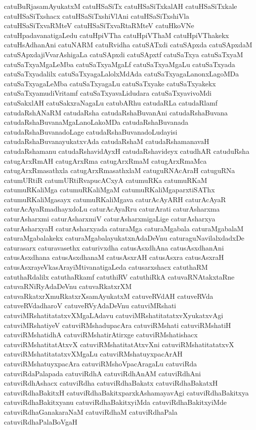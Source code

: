 {catuBuRjasamAyukatxM
catuHSaSiTx
catuHSaSiTxkalAH
catuHSaSiTxkale
catuHSaSiTxshacx
catuHSaSiTxshiVlAni
catuHSaSiTxshiVla
catuHSaSiTxvaRMteV
catuHSaSiTxvaRtaRMteV
catuHkoVNe
catuHpadavanatigaLedu
catuHpiVTha
catuHpiVThaM
catuHpiVThakekx
catuHsAdhanAni
catuNARM
catuRvidha
catuSATxdi
catuSApxda
catuSApxdaM
catuSApxdajiVvarAshigaLa
catuSApxdi
catuSApxtf
catuSaTxya
catuSaTxyaM
catuSaTxyaMgaLeMba
catuSaTxyaMgaLf
catuSaTxyaMgaLu
catuSaTxyada
catuSaTxyadalilx
catuSaTxyagaLalolxMdAda
catuSaTxyagaLanonxLagoMDa
catuSaTxyagaLeMba
catuSaTxyagaLu
catuSaTxyake
catuSaTxyakekx
catuSaTxyamudiVritamf
catuSaTxyavaLidudara
catuSaTxyavivoMdi
catuSakxlAH
catuSakxraNagaLu
catubARhu
catudaRLa
catudaRlamf
catudaRshANaRM
catudaRsha
catudaRshaBuvanAni
catudaRshaBuvana
catudaRshaBuvanaMgaLanoLakoMDa
catudaRshaBuvanada
catudaRshaBuvanadoLage
catudaRshaBuvanadoLudayisi
catudaRshaBuvanayukatxvAda
catudaRshaM
catudaRshamanavaH
catudaRshamanu
catudaRshavidAyxH
catudaRshavideyx
catudhAR
catuduRsha
catugArxRmAH
catugArxRma
catugArxRmaM
catugArxRmaMca
catugArxRmasathxla
catugArxRmasathxlaM
catuguRNAcAraH
catuguRNa
catumURtiR
catumURtiRvapucACxyA
catumuRKa
catumuRKaM
catumuRKaliMga
catumuRKaliMgaM
catumuRKaliMgaparxtiSAThx
catumuRKaliMgasayx
catumuRKaliMgava
caturAcAyARH
caturAcAyaR
caturAcAyaRmadhayxdoLu
caturAcAyaRru
caturArati
caturAsharxma
caturAsharxmi
caturAsharxmiV
caturAsharxmigaLige
caturAsharxya
caturAsharxyaH
caturAsharxyada
caturaMga
caturaMgabala
caturaMgabalaM
caturaMgabalakekx
caturaMgabalayukatxnAdaDeVnu
caturaguNavilalxdadxDe
caturasarx
caturavasethx
caturivxdha
catusAsxdhAna
catusAsxdhanAni
catusAsxdhana
catusAsxdhanaM
catusAsxrAH
catusAsxra
catusAsxraH
catusAsxrayeVkasArayiMtivanatigaLeda
catusarxshacx
catuthaRM
catuthaRdalilx
catuthaRkamf
catuthiRV
catuthiRkA
catuvaRNAtakxtaRne
catuvaRNiRyAdaDeVnu
catuvaRkatxrXM
catuvaRkatxrXmuRkatxrXsamAyukatxM
catuveRVdAH
catuveRVda
catuveRVdadharoV
catuveRVyAdaDeVnu
catuviMRshati
catuviMRshatitatatxvXMgaLAdavu
catuviMRshatitatatxvXyukatxvAgi
catuviMRshatiyeV
catuviRMshadupacAra
catuviRMshati
catuviRMshatiH
catuviRMshatidhA
catuviRMshatirAtirxge
catuviRMshatishacx
catuviRMshatitatAtxvX
catuviRMshatitatAtxvXni
catuviRMshatitatatxvX
catuviRMshatitatatxvXMgaLu
catuviRMshatuyxpacArAH
catuviRMshatuyxpacAra
catuviRMshoVpacAragaLu
catuviRda
catuviRdaPalapada
catuviRdhA
catuviRdhAnAM
catuviRdhAni
catuviRdhAshacx
catuviRdha
catuviRdhaBakatx
catuviRdhaBakatxH
catuviRdhaBakitxH
catuviRdhaBakitxparxkAshamayavAgi
catuviRdhaBakitxya
catuviRdhaBakitxyanu
catuviRdhaBakitxyiMda
catuviRdhaBakitxyiMde
catuviRdhaGanakaraNaM
catuviRdhaM
catuviRdhaPala
catuviRdhaPalaBoVgaH
}

